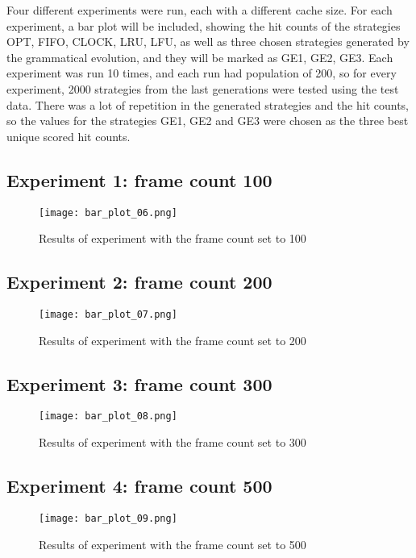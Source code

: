 Four different experiments were run, each with a different cache size. For each experiment, a bar plot will be included, showing the hit counts of the strategies OPT, FIFO, CLOCK, LRU, LFU, as well as three chosen strategies generated by the grammatical evolution, and they will be marked as GE1, GE2, GE3. Each experiment was run 10 times, and each run had population of 200, so for every experiment, 2000 strategies from the last generations were tested using the test data. There was a lot of repetition in the generated strategies and the hit counts, so the values for the strategies GE1, GE2 and GE3 were chosen as the three best unique scored hit counts.

\subsection{Experiment 1: frame count 100}

\begin{figure}[H]
	\centering
	\texttt{[image: bar\_plot\_06.png]}
	\caption{Results of experiment with the frame count set to 100}
\end{figure}

\subsection{Experiment 2: frame count 200}

\begin{figure}[H]
	\centering
	\texttt{[image: bar\_plot\_07.png]}
	\caption{Results of experiment with the frame count set to 200}
\end{figure}

\subsection{Experiment 3: frame count 300}

\begin{figure}[H]
	\centering
	\texttt{[image: bar\_plot\_08.png]}
	\caption{Results of experiment with the frame count set to 300}
\end{figure}

\subsection{Experiment 4: frame count 500}

\begin{figure}[H]
	\centering
	\texttt{[image: bar\_plot\_09.png]}
	\caption{Results of experiment with the frame count set to 500}
\end{figure}

